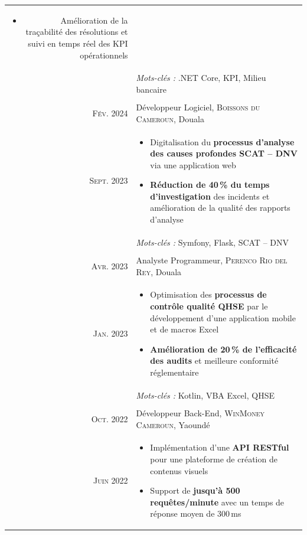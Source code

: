 \begin{longtable}{R{\leftcolumnlength}|p{\rightcolumnlength}}
{\begin{itemize}
			\item Amélioration de la traçabilité des résolutions et suivi en temps réel des KPI opérationnels
		\end{itemize}
		\vspace{-1em}
	}\\&
 	\footnotesize{\emph{Mots-clés :} .NET Core, KPI, Milieu bancaire}\\
  \\
 	\textsc{Fév. 2024} & Développeur Logiciel, \textsc{Boissons du Cameroun}, Douala\\
 	\textsc{Sept. 2023} &
 	\footnotesize{
 	 	\begin{itemize}
			\item Digitalisation du \textbf{processus d'analyse des causes profondes SCAT -- DNV} via une application web
			\item \textbf{Réduction de 40\,\% du temps d'investigation} des incidents et amélioration de la qualité des rapports d'analyse
		\end{itemize}
		\vspace{-1em}
	}\\&
 	\footnotesize{\emph{Mots-clés :} Symfony, Flask, SCAT -- DNV}\\
  \\
 	\textsc{Avr. 2023} & Analyste Programmeur, \textsc{Perenco Rio del Rey}, Douala\\
 	\textsc{Jan. 2023} &
 	\footnotesize{
 	 	\begin{itemize}
			\item Optimisation des \textbf{processus de contrôle qualité QHSE} par le développement d'une application mobile et de macros Excel
			\item \textbf{Amélioration de 20\,\% de l'efficacité des audits} et meilleure conformité réglementaire
		\end{itemize}
		\vspace{-1em}
	}\\&
 	\footnotesize{\emph{Mots-clés :} Kotlin, VBA Excel, QHSE}\\
  \\
 	\textsc{Oct. 2022} & Développeur Back-End, \textsc{WinMoney Cameroun}, Yaoundé\\
 	\textsc{Juin 2022} &
 	\footnotesize{
 	 	\begin{itemize}
			\item Implémentation d'une \textbf{API RESTful} pour une plateforme de création de contenus visuels
			\item Support de \textbf{jusqu'à 500 requêtes/minute} avec un temps de réponse moyen de 300\,ms

\end{itemize}}
\end{longtable}
